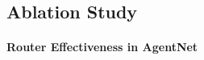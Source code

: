 \documentclass{article}
\begin{document}





\subsection{Ablation Study}
\paragraph{Router Effectiveness in AgentNet}
\end{document}
